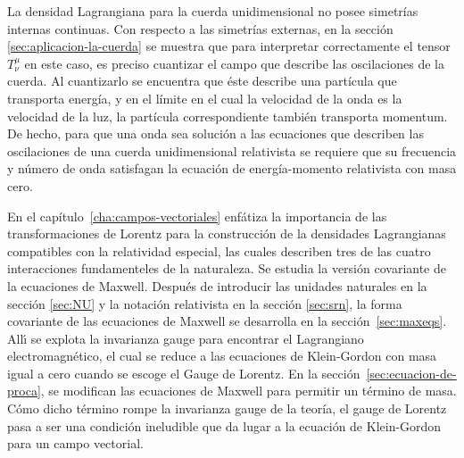 La densidad Lagrangiana para la cuerda unidimensional no posee simetrías internas continuas. Con respecto a las simetrías externas, en la sección \ref{sec:aplicacion-la-cuerda} se muestra que para interpretar correctamente el tensor $T^\mu_\nu$ en este caso, es preciso cuantizar el campo que describe las oscilaciones de la cuerda. Al cuantizarlo se encuentra que éste describe una partícula que transporta energía, y en el límite en el cual la velocidad de la onda es la velocidad de la luz, la partícula correspondiente también transporta momentum. De hecho, para que una onda sea solución a las ecuaciones que describen las oscilaciones de una cuerda unidimensional relativista se requiere que su frecuencia y número de onda satisfagan la ecuación de energía-momento relativista con masa cero.

En el capítulo~\ref{cha:campos-vectoriales} enfátiza la importancia de las transformaciones de Lorentz para la construcción de la densidades Lagrangianas compatibles con la relatividad especial, las cuales describen tres de las cuatro interacciones fundamenteles de la naturaleza.
Se estudia la versión covariante de la ecuaciones de Maxwell. Después de introducir las unidades naturales en la sección \ref{sec:NU} y la notación relativista en la sección \ref{sec:srn}, la forma covariante de las ecuaciones de Maxwell se desarrolla en la sección~\ref{sec:maxeqs}. All\'\i{} se explota la invarianza gauge para encontrar el Lagrangiano electromagnético, el cual se reduce a las ecuaciones de Klein-Gordon con masa igual a cero cuando se escoge el Gauge de Lorentz. En la sección~\ref{sec:ecuacion-de-proca}, se modifican las ecuaciones de Maxwell para permitir un término de masa. Cómo dicho término rompe la invarianza gauge de la teoría, el gauge de Lorentz pasa a ser una condición ineludible que da lugar a la ecuación de Klein-Gordon para un campo vectorial.



